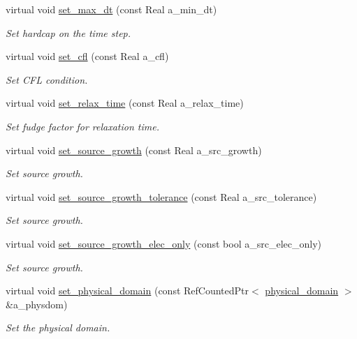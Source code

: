 \begin{DoxyCompactItemize}
virtual void \hyperlink{classtime__stepper_a564af894688cbc30f6cf5fb51283dc09}{set\+\_\+max\+\_\+dt} (const Real a\+\_\+min\+\_\+dt)
\begin{DoxyCompactList}\small\item\em Set hardcap on the time step. \end{DoxyCompactList}\item 
virtual void \hyperlink{classtime__stepper_a060293fa551134661a8799a4fb9e3a57}{set\+\_\+cfl} (const Real a\+\_\+cfl)
\begin{DoxyCompactList}\small\item\em Set C\+FL condition. \end{DoxyCompactList}\item 
virtual void \hyperlink{classtime__stepper_a183d152677a4702d91556693cfd75d4f}{set\+\_\+relax\+\_\+time} (const Real a\+\_\+relax\+\_\+time)
\begin{DoxyCompactList}\small\item\em Set fudge factor for relaxation time. \end{DoxyCompactList}\item 
virtual void \hyperlink{classtime__stepper_a67cd551ab8a561553961239886f7de0d}{set\+\_\+source\+\_\+growth} (const Real a\+\_\+src\+\_\+growth)
\begin{DoxyCompactList}\small\item\em Set source growth. \end{DoxyCompactList}\item 
virtual void \hyperlink{classtime__stepper_a6a4dd286b2bea591c18e27a8422a95e7}{set\+\_\+source\+\_\+growth\+\_\+tolerance} (const Real a\+\_\+src\+\_\+tolerance)
\begin{DoxyCompactList}\small\item\em Set source growth. \end{DoxyCompactList}\item 
virtual void \hyperlink{classtime__stepper_a8fc4a6732e13a142feb45eca360f2e1b}{set\+\_\+source\+\_\+growth\+\_\+elec\+\_\+only} (const bool a\+\_\+src\+\_\+elec\+\_\+only)
\begin{DoxyCompactList}\small\item\em Set source growth. \end{DoxyCompactList}\item 
virtual void \hyperlink{classtime__stepper_a8d09d76edafd510ae60833eebcc24e10}{set\+\_\+physical\+\_\+domain} (const Ref\+Counted\+Ptr$<$ \hyperlink{classphysical__domain}{physical\+\_\+domain} $>$ \&a\+\_\+physdom)
\begin{DoxyCompactList}\small\item\em Set the physical domain. \end{DoxyCompactList}\item 

\end{DoxyCompactItemize}
